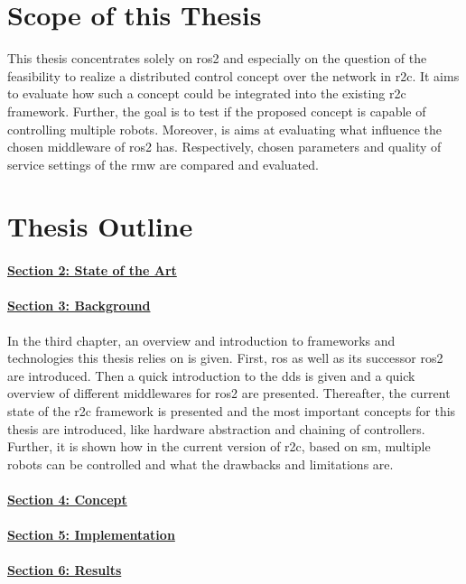 \section{Scope of this Thesis}
This thesis concentrates solely on \gls{ros2} and especially on the question of the feasibility to realize a distributed control concept over the network in \gls{r2c}. It aims to evaluate how such a concept could be integrated into the existing \gls{r2c} framework. Further, the goal is to test if the proposed concept is capable of controlling multiple robots. Moreover, is aims at evaluating what influence the chosen middleware of \gls{ros2} has. Respectively, chosen parameters and quality of service settings of the \gls{rmw} are compared and evaluated.


\section{Thesis Outline}
\paragraph{\hyperref[sec:state_of_the_art]{Section 2: State of the Art}}
\paragraph{\hyperref[sec:background]{Section 3: Background}}
In the third chapter, an overview and introduction to frameworks and technologies this thesis relies on is given. First, \gls{ros} as well as its successor \gls{ros2} are introduced. Then a quick introduction to the \acrlong{dds} is given and a quick overview of different middlewares for \gls{ros2} are presented. Thereafter, the current state of the \gls{r2c} framework is presented and the most important concepts for this thesis are introduced, like hardware abstraction and chaining of controllers. Further, it is shown how in the current version of \gls{r2c}, based on \acrlong{sm}, multiple robots can be controlled and what the drawbacks and limitations are.
\paragraph{\hyperref[sec:concept]{Section 4: Concept}}
\paragraph{\hyperref[sec:implementation]{Section 5: Implementation}}
\paragraph{\hyperref[sec:results]{Section 6: Results}}
